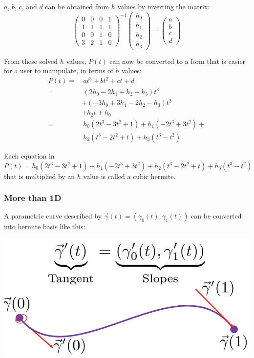 \documentclass[12pt]{article}
\begin{document}
$a$, $b$, $c$, and $d$ can be obtained from $h$ values by inverting the matrix:
\[
    \begin{pmatrix}
        0 & 0 & 0 & 1\\
        1 & 1 & 1 & 1\\
        0 & 0 & 1 & 0\\
        3 & 2 & 1 & 0
    \end{pmatrix}^{-1}
    \begin{pmatrix}
        h_0\\
        h_1\\
        h_2\\
        h_3
    \end{pmatrix}
    =
    \begin{pmatrix}
        a\\
        b\\
        c\\
        d
    \end{pmatrix}
\]

From these solved $h$ values, $P(t)$ can now be converted to a form that is
easier for a user to manipulate, in terms of $h$ values:
\begin{align*}
    P(t) =& \ at^3 + bt^2 + ct + d\\
    =& \ (2h_0 - 2h_1 + h_2 + h_3)t^3\\
        &+ (-3h_0 + 3h_1 - 2h_2 - h_3)t^2\\
        &+ h_2t + h_0\\
    =& \ h_0(2t^3 - 3t^2 + 1) + h_1(-2t^3 + 3t^2) +\\
       & \ h_2(t^3 - 2t^2 + t) + h_3(t^3 - t^2)
\end{align*}

Each equation in $P(t) = h_0(2t^3 - 3t^2 + 1) +
h_1(-2t^3 + 3t^2) + h_2(t^3 - 2t^2 + t) + h_3(t^3 - t^2)$ that is multiplied
by an $h$ value is called a cubic hermite.

\subsubsection{More than 1D}

A parametric curve described by $\vec \gamma(t) = (\gamma_0(t),
\gamma_1(t))$ can be converted into hermite basis like this:

\includegraphics[scale=.5]{images/parametric-hermite.png}
\end{document}
